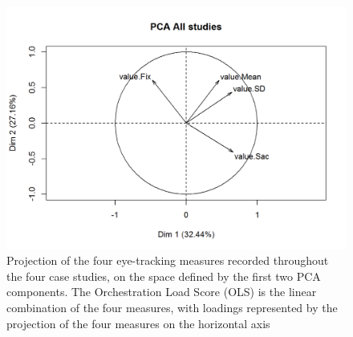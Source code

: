 \documentclass[10pt,journal,compsoc]{IEEEtran}
\begin{document}

\begin{figure}[!t]
\centering
\includegraphics[width=\linewidth]{img/PCA.png}
\caption{Projection of the four eye-tracking measures recorded throughout the four case studies, on the space defined by the first two PCA components. The Orchestration Load Score (OLS) is the linear combination of the four measures, with loadings represented by the projection of the four measures on the horizontal axis}
\label{fig:pca}
\end{figure}
\end{document}

